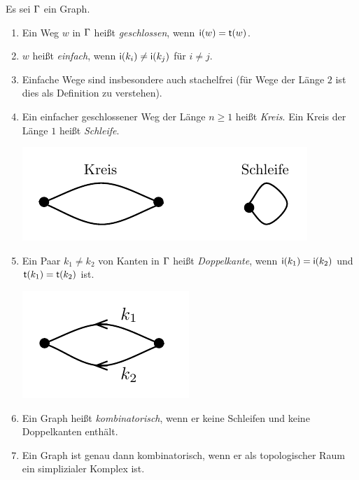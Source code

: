 \documentclass[a4paper, 12pt, twoside]{article}
\begin{document}
\DB Es sei $\Gamma$ ein Graph.
\begin{enumerate}
\item Ein Weg $w$ in $\Gamma$ heißt \emph{geschlossen},
wenn $\mathsf{i}(w)=\mathsf{t}(w)$.
\item $w$ heißt \emph{einfach},
wenn $\mathsf{i}(k_i)\neq\mathsf{i}(k_j)$ für $i\neq j$.
\item Einfache Wege sind insbesondere auch stachelfrei (für Wege
der Länge $2$ ist dies als Definition zu verstehen).
\item Ein einfacher geschlossener Weg der Länge $n\geq 1$ heißt
\emph{Kreis}.
Ein Kreis der Länge $1$ heißt \emph{Schleife}.
\begin{center}
	\includegraphics{grugraImages/kreis}
\end{center}
\item Ein Paar $k_1\neq k_2$ von Kanten in $\Gamma$ heißt \emph{Doppelkante},
wenn $\mathsf{i}(k_1)=\mathsf{i}(k_2)$ und $\mathsf{t}(k_1)=\mathsf{t}(k_2)$ ist.
\begin{center}
	\includegraphics{grugraImages/doppelkante}
\end{center}
\item Ein Graph heißt \emph{kombinatorisch},
wenn er keine Schleifen und keine Doppelkanten enthält.
\item Ein Graph ist genau dann kombinatorisch, wenn er als
topologischer Raum ein simplizialer Komplex ist.
\end{enumerate}
\end{document}
